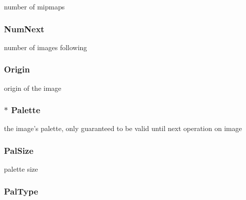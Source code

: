 number of mipmaps 

\hypertarget{struct_i_l_uinfo_a4d2c3fed597dfde7feaea3217ef1ac35}{
\subsubsection[{Num\+Next}]{ Num\+Next}}\label{struct_i_l_uinfo_a4d2c3fed597dfde7feaea3217ef1ac35}


number of images following 

\hypertarget{struct_i_l_uinfo_a6f7c49ddc9cd419e2d2af24255df902a}{
\subsubsection[{Origin}]{ Origin}}\label{struct_i_l_uinfo_a6f7c49ddc9cd419e2d2af24255df902a}


origin of the image 

\hypertarget{struct_i_l_uinfo_ab520cff305ed9ee13d2eac7a87ac1d92}{
\subsubsection[{Palette}]{$\ast$ Palette}}\label{struct_i_l_uinfo_ab520cff305ed9ee13d2eac7a87ac1d92}


the image's palette, only guaranteed to be valid until next operation on image 

\hypertarget{struct_i_l_uinfo_a728a63d4c8b857a800a4d19e250a8c4b}{
\subsubsection[{Pal\+Size}]{ Pal\+Size}}\label{struct_i_l_uinfo_a728a63d4c8b857a800a4d19e250a8c4b}


palette size 

\hypertarget{struct_i_l_uinfo_ab091aab8d79003031a4e9957e85f43ca}{
\subsubsection[{Pal\+Type}]{ Pal\+Type}}\label{struct_i_l_uinfo_ab091aab8d79003031a4e9957e85f43ca}


